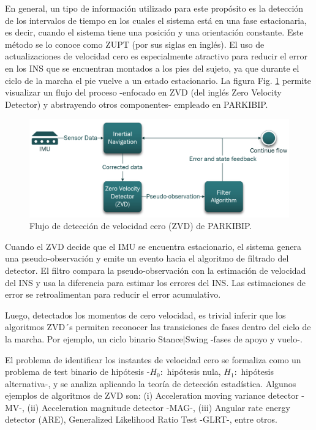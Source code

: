 En general, un tipo de información utilizado para este propósito es la detección de los intervalos de tiempo en los cuales el sistema está en una fase estacionaria, es decir, cuando el sistema tiene una posición y una orientación constante. Este método se lo conoce como ZUPT (por sus siglas en inglés). El uso de actualizaciones de velocidad cero es especialmente atractivo para reducir el error en los INS que se encuentran montados a los pies del sujeto, ya que durante el ciclo de la marcha el pie vuelve a un estado estacionario. La figura Fig. \ref{fig:zero-velocity} permite visualizar un flujo del proceso -enfocado en \gls{ZVD} (del inglés Zero Velocity Detector) y abstrayendo otros componentes- empleado en PARKIBIP.

\begin{figure}[H]
\includegraphics[width=\textwidth]{TESIS/imagenes/chap04/zero-velocity.PNG}
\caption{ Flujo de detección de velocidad cero (ZVD) de PARKIBIP.}
\label{fig:zero-velocity}
\end{figure}

\noindent Cuando el ZVD decide que el IMU se encuentra estacionario, el sistema genera una pseudo-observación y emite un evento hacia el algoritmo de filtrado del detector. El filtro compara la pseudo-observación con la estimación de velocidad del INS y usa la diferencia para estimar los errores del INS. Las estimaciones de error se retroalimentan para reducir el error acumulativo.

Luego, detectados los momentos de cero velocidad, es trivial inferir que los algoritmos ZVD´s permiten reconocer las transiciones de fases dentro del ciclo de la marcha. Por ejemplo, un ciclo binario Stance|Swing -fases de apoyo y vuelo-.

El problema de identificar los instantes de velocidad cero se formaliza como un problema de test binario de hipótesis -$H_0:$ hipótesis nula, $H_1:$ hipótesis alternativa-, y se analiza aplicando la teoría de detección estadística. Algunos ejemplos de algoritmos de ZVD son: (i) Acceleration moving variance detector -MV-, (ii) Acceleration magnitude detector -MAG-, (iii) Angular rate energy  detector (ARE), Generalized Likelihood Ratio Test -GLRT-, entre otros.

